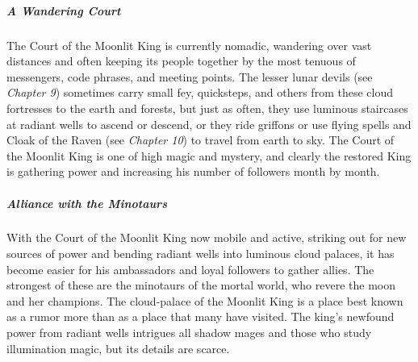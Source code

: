 \documentclass[10pt,a4paper,twoside,bg=print,twocolumn,openany,nodeprecatedcode]{dndbook}
\begin{document}
\subparagraph{A Wandering Court}
The Court of the Moonlit King is currently nomadic, wandering over vast distances and often keeping its people together by the most tenuous of messengers, code phrases, and meeting points. The lesser lunar devils (see \textit{Chapter 9}) sometimes carry small fey, quicksteps, and others from these cloud fortresses to the earth and forests, but just as often, they use luminous staircases at radiant wells to ascend or descend, or they ride griffons or use flying spells and Cloak of the Raven (see \textit{Chapter 10}) to travel from earth to sky. The Court of the Moonlit King is one of high magic and mystery, and clearly the restored King is gathering power and increasing his number of followers month by month.

\subparagraph{Alliance with the Minotaurs}
With the Court of the Moonlit King now mobile and active, striking out for new sources of power and bending radiant wells into luminous cloud palaces, it has become easier for his ambassadors and loyal followers to gather allies. The strongest of these are the minotaurs of the mortal world, who revere the moon and her champions. The cloud-palace of the Moonlit King is a place best known as a rumor more than as a place that many have visited. The king's newfound power from radiant wells intrigues all shadow mages and those who study illumination magic, but its details are scarce.
\end{document}

